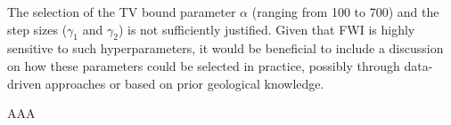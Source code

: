 \begin{point}
	The selection of the TV bound parameter $\alpha$ (ranging from 100 to 700) and the step sizes ($\gamma_{1}$ and $\gamma_{2}$) is not sufficiently justified. Given that FWI is highly sensitive to such hyperparameters, it would be beneficial to include a discussion on how these parameters could be selected in practice, possibly through data-driven approaches or based on prior geological knowledge.
\end{point}

\begin{reply}
	AAA
\end{reply}


